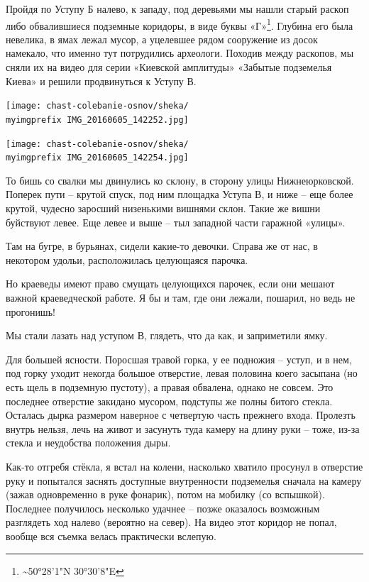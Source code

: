 Пройдя по Уступу Б налево, к западу, под деревьями мы нашли старый раскоп либо обвалившиеся подземные коридоры, в виде буквы «Г»\footnote{\textasciitilde{}50°28'1"N 30°30'8"E}. Глубина его была невелика, в ямах лежал мусор, а уцелевшее рядом сооружение из досок намекало, что именно тут потрудились археологи. Походив между раскопов, мы сняли их на видео для серии «Киевской амплитуды» «Забытые подземелья Киева» и решили продвинуться к Уступу В. 

\begin{center}
\texttt{[image: chast-colebanie-osnov/sheka/\\myimgprefix IMG\_20160605\_142252.jpg]}
\end{center}

\begin{center}
\texttt{[image: chast-colebanie-osnov/sheka/\\myimgprefix IMG\_20160605\_142254.jpg]}
\end{center}

\newpage

То бишь со свалки мы двинулись ко склону, в сторону улицы Нижнеюрковской. Поперек пути – крутой спуск, под ним площадка Уступа В, и ниже – еще более крутой, чудесно заросший низенькими вишнями склон. Такие же вишни буйствуют левее. Еще левее и выше – тыл западной части гаражной «улицы».

Там на бугре, в бурьянах, сидели какие-то девочки. Справа же от нас, в некотором удольи, расположилась целующаяся парочка.

Но краеведы имеют право смущать целующихся парочек, если они мешают важной краеведческой работе. Я бы и там, где они лежали, пошарил, но ведь не прогонишь!
 
Мы стали лазать над уступом В, глядеть, что да как, и заприметили ямку.

Для большей ясности. Поросшая травой горка, у ее подножия – уступ, и в нем, под горку уходит некогда большое отверстие, левая половина коего засыпана (но есть щель в подземную пустоту), а правая обвалена, однако не совсем. Это последнее отверстие закидано мусором, подступы же полны битого стекла. Осталась дырка размером наверное с четвертую часть прежнего входа. Пролезть внутрь нельзя, лечь на живот и засунуть туда камеру на длину руки – тоже, из-за стекла и неудобства положения дыры.

Как-то отгребя стёкла, я встал на колени, насколько хватило просунул в отверстие руку и попытался заснять доступные внутренности подземелья сначала на камеру (зажав одновременно в руке фонарик), потом на мобилку (со вспышкой). Последнее получилось несколько удачнее – позже оказалось возможным разглядеть ход налево (вероятно на север). На видео этот коридор не попал, вообще вся съемка велась практически вслепую.


